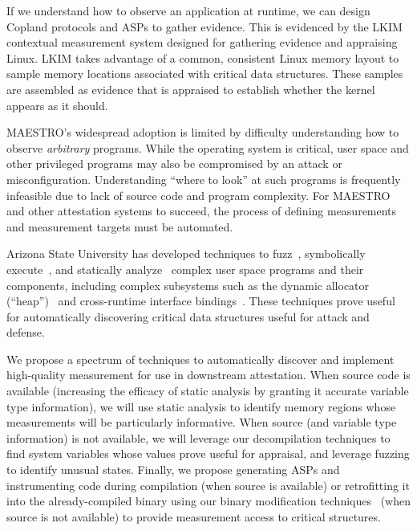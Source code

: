 \documentclass[runningheads]{llncs}
\begin{document}
If we understand how to observe an application at runtime, we can
design Copland protocols and ASPs to gather evidence.  This is
evidenced by the LKIM~\citep{Loscocco:07:Linux-kernel-in} contextual
measurement system designed for gathering evidence and appraising
Linux.  LKIM takes advantage of a common, consistent Linux memory
layout to sample memory locations associated with critical data
structures.  These samples are assembled as evidence that is appraised
to establish whether the kernel appears as it should.

MAESTRO's widespread adoption is limited by difficulty understanding
how to observe \emph{arbitrary} programs.  While the operating system is
critical, user space and other privileged programs may also be compromised
by an attack or misconfiguration.  Understanding ``where to look'' at
such programs is frequently infeasible due to lack of source
code and program complexity.  For MAESTRO and other attestation
systems to succeed, the process of defining measurements and
measurement targets must be automated.

Arizona State University has developed
techniques to fuzz~\citep{trickel2022toss,salls2020exploring,peng2018t}, symbolically execute~\citep{stephens2016driller,shoshitaishvili2016sok}, and statically analyze~\citep{das2022hybrid,vadayath2022arbiter} complex user space programs and their components, including complex subsystems such as the dynamic allocator (``heap'')~\citep{eckert2018heaphopper} and cross-runtime interface bindings~\citep{dinh2021favocado}.
These techniques prove useful for automatically discovering critical data structures useful for attack and defense.

We propose a spectrum of techniques to automatically discover and
implement high-quality measurement for use in downstream attestation.
When source code is available (increasing the efficacy of static analysis by granting it accurate variable type information), we will use static analysis to identify memory regions whose measurements will be particularly informative.
When source (and variable type information) is not available, we will leverage our decompilation techniques to find system variables whose values prove useful for appraisal, and leverage fuzzing to identify unusual states.
Finally, we propose generating ASPs and instrumenting code during compilation (when source is available) or retrofitting it into the already-compiled binary using our binary modification techniques~\citep{wang2017ramblr} (when source is not available) to provide measurement access to critical structures.
\end{document}
